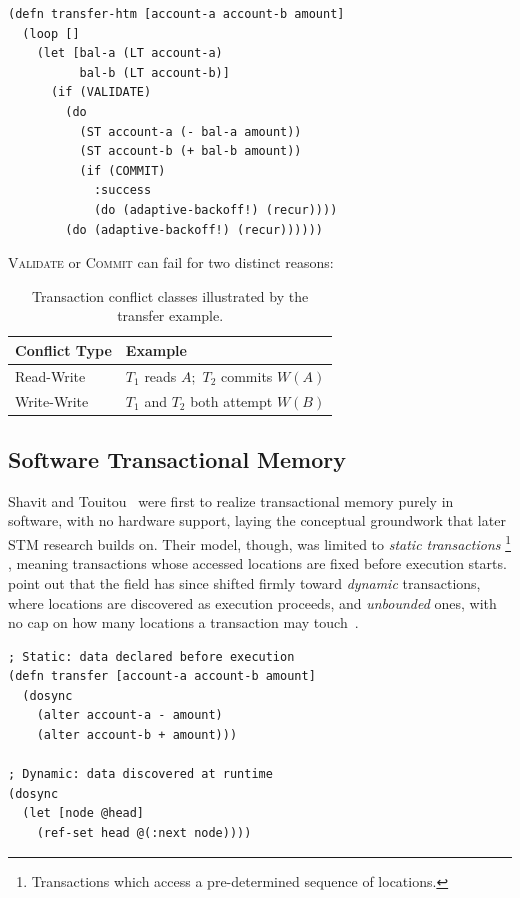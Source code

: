 \begin{listing}[ht]
  \begin{verbatim}
(defn transfer-htm [account-a account-b amount]
  (loop []
    (let [bal-a (LT account-a)
          bal-b (LT account-b)]
      (if (VALIDATE)
        (do
          (ST account-a (- bal-a amount))
          (ST account-b (+ bal-b amount))
          (if (COMMIT)
            :success
            (do (adaptive-backoff!) (recur))))
        (do (adaptive-backoff!) (recur))))))
\end{verbatim}
  \caption{HTM-style transaction.}
\end{listing}

\textsc{Validate} or \textsc{Commit} can fail for two distinct reasons:

\begin{table}[h]
  \centering
  \begin{tabular}{ll}
    \hline
    \textbf{Conflict Type} & \textbf{Example}                       \\
    \hline
    Read-Write             & $T_1$ reads $A$;\ $T_2$ commits $W(A)$ \\
    Write-Write            & $T_1$ and $T_2$ both attempt $W(B)$    \\
    \hline
  \end{tabular}
  \caption{Transaction conflict classes illustrated by the transfer example.}
\end{table}

\subsection{Software Transactional Memory}

Shavit and Touitou~\cite{shavit1995} were first to realize transactional
memory purely in software, with no hardware support, laying the conceptual
groundwork that later STM research builds on. Their model, though, was
limited to \emph{static transactions}%
\footnote{Transactions which access a pre-determined sequence of locations.}
, meaning transactions whose accessed locations are fixed before execution starts.
\citeauthor{dice2006transactional} point out that the field has since shifted
firmly toward \emph{dynamic} transactions, where locations are discovered as
execution proceeds, and \emph{unbounded} ones, with no cap on how many
locations a transaction may touch~\cite{dice2006transactional}.

\begin{listing}[ht]
  \begin{verbatim}
; Static: data declared before execution
(defn transfer [account-a account-b amount]
  (dosync
    (alter account-a - amount)
    (alter account-b + amount)))

; Dynamic: data discovered at runtime
(dosync
  (let [node @head]
    (ref-set head @(:next node))))
\end{verbatim}
  \caption{Static vs.\ dynamic transactions.}
\end{listing}

